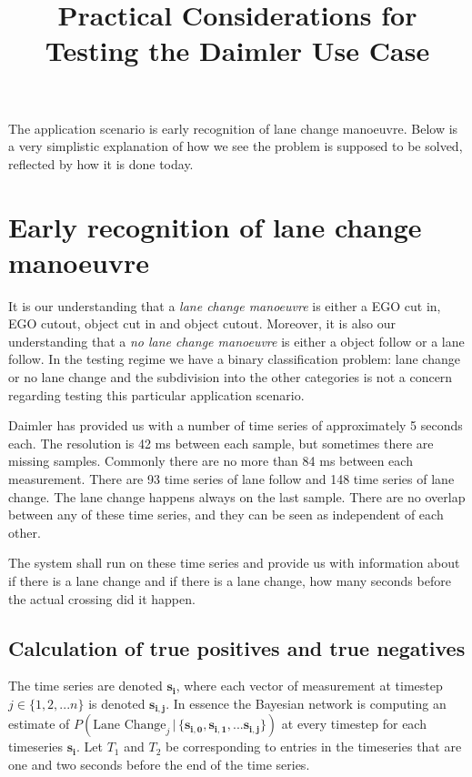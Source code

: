 \documentclass{article}
\title{Practical Considerations for Testing the Daimler Use Case}
\date{}
\theoremstyle{theorem}
\theoremstyle{definition}
\newcommand{\bu}[1]{\mathbf{#1}}
\newcommand{\bv}[1]{\bm{#1}}
\begin{document}
\maketitle

The application scenario is early recognition of lane change manoeuvre.  Below is a very simplistic explanation of how we see the problem is supposed to be solved, reflected by how it is done today.

\section{Early recognition of lane change manoeuvre}

It is our understanding that a \emph{lane change manoeuvre} is either a EGO cut in, EGO cutout, object cut in and object cutout.  Moreover, it is also our understanding that a \emph{no lane change manoeuvre} is either a object follow or a lane follow.  In the testing regime we have a binary classification problem: lane change or no lane change and the subdivision  into the other categories is not a concern regarding testing this particular application scenario.

Daimler has provided us with a number of time series of approximately 5 seconds each.  The resolution is 42 ms between each sample, but sometimes there are missing samples.  Commonly there are no more than 84 ms between each measurement.  There are 93 time series of lane follow and 148 time series of lane change.  The lane change happens always on the last sample. There are no overlap between any of these time series, and they can be seen as independent of each other.

The system shall run on these time series and provide us with information about if there is a lane change and if there is a lane change, how many seconds before the actual crossing did it happen.

\subsection*{Calculation of true positives and true negatives}

The time series are denoted $\bu{s_i}$, where each vector of measurement at timestep $j \in \{1,2, ... n\}$ is denoted $\bv{s_{i,j}}$. In essence the Bayesian network is computing an estimate of $P(\mbox{Lane Change}_j \,|\, \{ \bv{s_{i,0}}, \bv{s_{i,1}}, ... \bv{s_{i,j}} \})$ at every timestep for each timeseries $\bu{s_i}$.  Let $T_1$ and $T_2$ be corresponding to entries in the timeseries that are one and two seconds before the end of the time series.   
\end{document}
